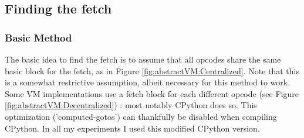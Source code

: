 \documentclass[english]{article}
\begin{document}
\subsection{Finding the fetch}

\subsubsection{Basic Method}

The basic idea to find the fetch is to assume that all opcodes share the same basic block for the fetch, as in Figure \ref{fig:abstractVM:Centralized}.
Note that this is a somewhat restrictive assumption, albeit necessary for this method to work. Some VM implementations use a fetch block for each different opcode (see Figure \ref{fig:abstractVM:Decentralized}) : most notably CPython does so. This optimization ('computed-gotos') can thankfully be disabled when compiling CPython. In all my experiments I used this modified CPython version.
\end{document}

